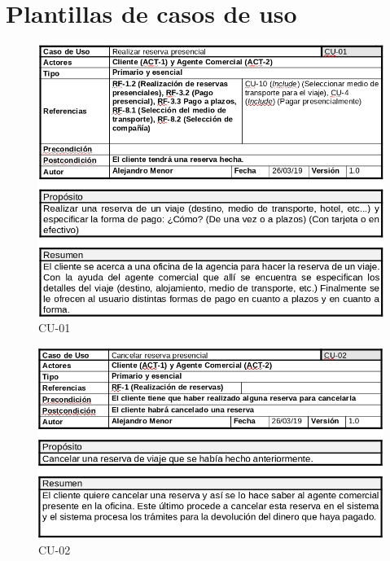 \documentclass{article}
\begin{document}
	\section{Plantillas de casos de uso}
	\begin{figure}[H]
		\centering
		\includegraphics[totalheight=10cm]{cu-01}
		\caption{CU-01}
		\label{fig:cu-01}
	\end{figure}
	\begin{figure}[H]
		\centering
		\includegraphics[totalheight=7cm]{cu-02}
		\caption{CU-02}
		\label{fig:cu-02}
	\end{figure}
\end{document}
